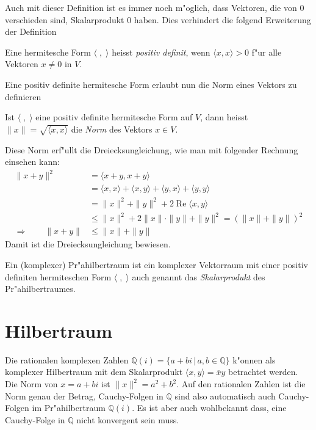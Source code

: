 Auch mit dieser Definition ist es immer noch m"oglich, dass Vektoren,
die von $0$ verschieden sind, Skalarprodukt $0$ haben.
Dies verhindert die folgend Erweiterung der Definition

\begin{definition}
\label{hilbert:postivdefiniteform}
Eine hermitesche Form $\langle\;,\;\rangle$ heisst {\em positiv definit},
wenn $\langle x,x\rangle > 0$ f"ur alle Vektoren $x\ne 0$ in $V$.
\end{definition}

Eine positiv definite hermitesche Form erlaubt nun die Norm
eines Vektors zu definieren

\begin{definition}
Ist $\langle \;,\;\rangle$ eine positiv definite hermitesche Form
auf $V$, dann heisst $\|x\| = \sqrt{\langle x,x\rangle}$ die {\em Norm}
des Vektors $x\in V$.
\end{definition}

Diese Norm erf"ullt die Dreiecksungleichung, wie man mit folgender
Rechnung einsehen kann:
\begin{align*}
\|x+y\|^2
&=
\langle x+y,x+y\rangle
\\
&=
\langle x,x\rangle
+
\langle x,y\rangle
+
\langle y,x\rangle
+
\langle y,y\rangle
\\
&=
\|x\|^2 + \|y\|^2
+ 2\operatorname{Re}\langle x,y\rangle
\\
&\le
\|x\|^2 + 2\|x\|\cdot \|y\| + \|y\|^2 = (\|x\| + \|y\|)^2
\\
\Rightarrow\qquad
\|x+y\|
&\le
\|x\| + \|y\|
\end{align*}
Damit ist die Dreiecksungleichung bewiesen.

\begin{definition}
Ein (komplexer) Pr"ahilbertraum ist ein komplexer Vektorraum mit
einer positiv definiten hermiteschen Form $\langle\;,\;\rangle$
auch genannt das {\em Skalarprodukt} des Pr"ahilbertraumes.
\end{definition}

\section{Hilbertraum}
Die rationalen komplexen Zahlen $\mathbb Q(i)=\{a+bi\,|\,a,b\in\mathbb Q\}$
k"onnen als komplexer Hilbertraum mit dem Skalarprodukt
$\langle x,y\rangle = \overline{x}y$ betrachtet werden.
Die Norm von $x=a+bi$ ist $\|x\|^2=a^2+b^2$.
Auf den rationalen Zahlen ist die Norm genau der Betrag, Cauchy-Folgen
in $\mathbb Q$ sind also automatisch auch Cauchy-Folgen im
Pr"ahilbertraum $\mathbb Q(i)$.
Es ist aber auch wohlbekannt dass, eine Cauchy-Folge in $\mathbb Q$
nicht konvergent sein muss.

